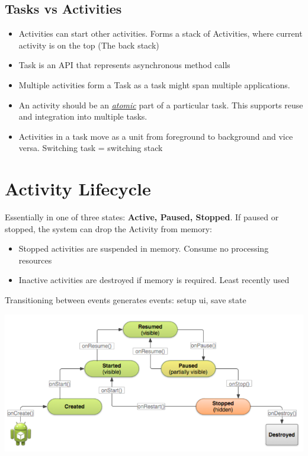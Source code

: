 \documentclass{article}
\newcommand{\worddef}[1]{\hyperref[sec:reference]{\textit{#1}}}
\begin{document}
\subsection{Tasks vs Activities}

\begin{itemize}
  \item Activities can start other activities. Forms a stack of Activities, where current activity is on the top (The back stack)
  \item Task is an API that represents asynchronous method calls  
  \item Multiple activities form a Task as a task might span multiple applications.
  \item An activity should be an \worddef{atomic} part of a particular task. This supports reuse and integration into multiple tasks.
  \item Activities in a task move as a unit from foreground to background and vice versa. Switching	task = switching stack
\end{itemize}

\section{Activity	Lifecycle}
Essentially in one of three states: \textbf{Active, Paused, Stopped}. If paused or stopped, the system can drop the Activity from memory:
\begin{itemize}
  \item Stopped activities are suspended in memory. Consume no processing resources
  \item Inactive activities are destroyed if memory is required. Least recently used
\end{itemize}
Transitioning	between	events	generates	events: setup ui, save state

\begin{center}
  \includegraphics[scale=0.5]{activity_lifecycle.png}
\end{center}
\end{document}
